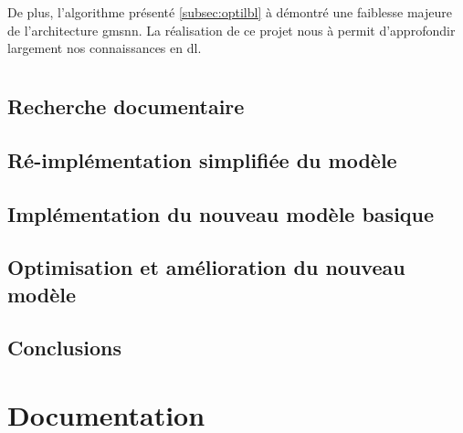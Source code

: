 De plus, l'algorithme présenté \autoref{subsec:optilbl} à démontré une faiblesse majeure de l'architecture \gls{gmsnn}.
La réalisation de ce projet nous à permit d'approfondir largement nos connaissances en \gls{dl}. 


\section{}
\subsection{Recherche documentaire} %
\subsection{Ré-implémentation simplifiée du modèle } %
\subsection{Implémentation du nouveau modèle basique} %
\subsection{Optimisation et amélioration du nouveau modèle}
\subsection{Conclusions}


\section{Documentation}



